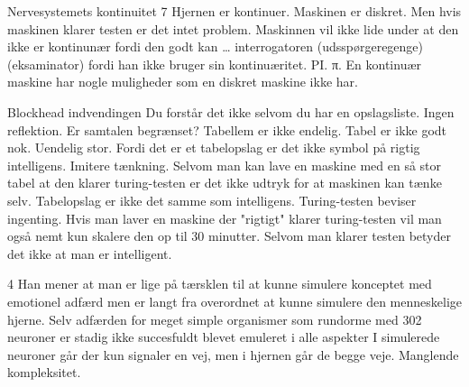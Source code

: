 \documentclass{article}
\begin{document}
Nervesystemets kontinuitet 7
Hjernen er kontinuer. Maskinen er diskret. Men hvis maskinen klarer testen er det intet problem.
Maskinnen vil ikke lide under at den ikke er kontinunær fordi den godt kan … interrogatoren (udsspørgeregenge) (eksaminator) fordi han ikke bruger sin  kontinuæritet. PI. π. En kontinuær maskine har nogle muligheder som en diskret maskine ikke har.

Blockhead indvendingen
Du forstår det ikke selvom du har en opslagsliste. Ingen reflektion. 
Er samtalen begrænset? Tabellem er ikke endelig. Tabel er ikke godt nok. Uendelig stor. Fordi det er et tabelopslag er det ikke symbol på rigtig intelligens. Imitere tænkning.
Selvom man kan lave en maskine med en så stor tabel at den klarer turing-testen er det ikke udtryk for at maskinen kan tænke selv. Tabelopslag er ikke det samme som intelligens. Turing-testen beviser ingenting.
Hvis man laver en maskine der "rigtigt" klarer turing-testen vil man også nemt kun skalere den op til 30 minutter.
Selvom man klarer testen betyder det ikke at man er intelligent.


4
Han mener at man er lige på tærsklen til at kunne simulere konceptet med emotionel adfærd men er langt fra overordnet at kunne simulere den menneskelige hjerne.
Selv adfærden for meget simple organismer som rundorme med 302 neuroner er stadig ikke succesfuldt blevet emuleret i alle aspekter
I simulerede neuroner går der kun signaler en vej, men i hjernen går de begge veje. Manglende kompleksitet.
\end{document}
